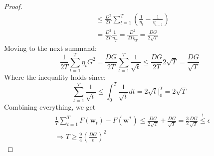 \begin{proof}
\begin{equation*}
\begin{split}
            &\leq \frac{D^2}{2T} \sum_{t=1}^T \left(\frac{1}{\eta_t} - \frac{1}{\eta_{t-1}}\right) \\
            &= \frac{D^2}{2T} \frac{1}{\eta_T} = \frac{D^2}{2T\eta_T} = \frac{DG}{2\sqrt{T}} 
        \end{split}
    \end{equation*}
    Moving to the next summand:
    \begin{equation*}
        \frac{1}{2T} \sum_{t=1}^T \eta_t G^2 = \frac{DG}{2T} \sum_{t=1}^T \frac{1}{\sqrt{t}} \leq \frac{DG}{2T} 2\sqrt{T} = \frac{DG}{\sqrt{T}}
    \end{equation*}
    Where the inequality holds since:
    \begin{equation*}
        \sum_{t=1}^T \frac{1}{\sqrt{t}} \leq \int_0^T \frac{1}{\sqrt{t}}dt = 2\sqrt{t}|^T_0 = 2\sqrt{T}
    \end{equation*}
    Combining everything, we get
    \begin{equation*}
        \begin{split}            
            &\frac{1}{T} \sum_{t=1}^T F(\pmb{w}_t) - F(\pmb{w}^*) \leq \frac{DG}{2\sqrt{T}} + \frac{DG}{\sqrt{T}} = \frac{3}{2} \frac{DG}{\sqrt{T}} \overset{!}{\leq} \epsilon \\
            &\Rightarrow T \geq \frac{9}{4} \left(\frac{DG}{\epsilon}\right)^2
        \end{split}
    \end{equation*}
\end{proof}
